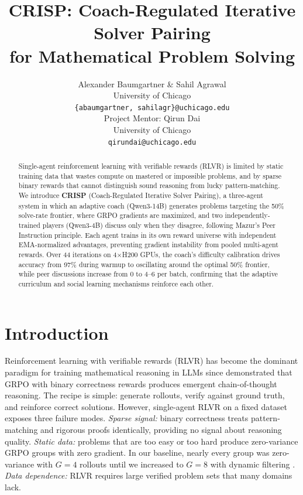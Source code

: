 \documentclass{article}
\title{CRISP: Coach-Regulated Iterative Solver Pairing\\for Mathematical Problem Solving}
\author{Alexander Baumgartner \& Sahil Agrawal \\
University of Chicago \\
\texttt{\{abaumgartner, sahilagr\}@uchicago.edu} \\
\And
Project Mentor: Qirun Dai \\
University of Chicago \\
\texttt{qirundai@uchicago.edu} \\
}
\begin{document}
\maketitle

\begin{abstract}
Single-agent reinforcement learning with verifiable rewards (RLVR) is limited by static training data that wastes compute on mastered or impossible problems, and by sparse binary rewards that cannot distinguish sound reasoning from lucky pattern-matching. We introduce \textbf{CRISP} (Coach-Regulated Iterative Solver Pairing), a three-agent system in which an adaptive coach (Qwen3-14B) generates problems targeting the 50\% solve-rate frontier, where GRPO gradients are maximized, and two independently-trained players (Qwen3-4B) discuss only when they disagree, following Mazur's Peer Instruction principle. Each agent trains in its own reward universe with independent EMA-normalized advantages, preventing gradient instability from pooled multi-agent rewards. Over 44 iterations on 4$\times$H200 GPUs, the coach's difficulty calibration drives accuracy from 97\% during warmup to oscillating around the optimal 50\% frontier, while peer discussions increase from 0 to 4--6 per batch, confirming that the adaptive curriculum and social learning mechanisms reinforce each other.
\end{abstract}

\section{Introduction}

Reinforcement learning with verifiable rewards (RLVR) has become the dominant paradigm for training mathematical reasoning in LLMs since \citet{guo2025deepseek} demonstrated that GRPO with binary correctness rewards produces emergent chain-of-thought reasoning. The recipe is simple: generate rollouts, verify against ground truth, and reinforce correct solutions. However, single-agent RLVR on a fixed dataset exposes three failure modes. \emph{Sparse signal:} binary correctness treats pattern-matching and rigorous proofs identically, providing no signal about reasoning quality. \emph{Static data:} problems that are too easy or too hard produce zero-variance GRPO groups with zero gradient. In our baseline, nearly every group was zero-variance with $G\!=\!4$ rollouts until we increased to $G\!=\!8$ with dynamic filtering \citep{yu2025dapo}. \emph{Data dependence:} RLVR requires large verified problem sets that many domains lack.
\end{document}
